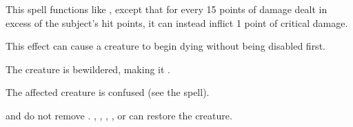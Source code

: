 \begin{spelleffect}
    This spell functions like , except that for every 15 points of damage dealt in excess of the subject's hit points, it can instead inflict 1 point of critical damage.
\end{spelleffect}
\begin{spellnotes}
    This effect can cause a creature to begin dying without being disabled first.
\end{spellnotes}

\begin{spellhealthy}
    The creature is bewildered, making it \vulnerable.
\end{spellhealthy}
\begin{spellblood}
    \par The affected creature is confused (see the  spell).
\end{spellblood}
\begin{spellnotes}
     and  do not remove . , , , , or  can restore the creature.
\end{spellnotes}

